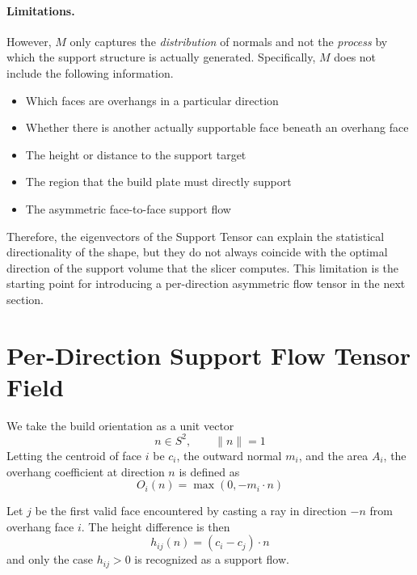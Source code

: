 \documentclass[11pt,a4paper]{article}
\begin{document}
\paragraph{Limitations.}
However, $M$ only captures the \emph{distribution} of normals and not the \emph{process} by which the support structure is actually generated.
Specifically, $M$ does not include the following information.

\begin{itemize}
\item Which faces are overhangs in a particular direction
\item Whether there is another actually supportable face beneath an overhang face
\item The height or distance to the support target
\item The region that the build plate must directly support
\item The asymmetric face-to-face support flow
\end{itemize}

Therefore, the eigenvectors of the Support Tensor can explain the statistical directionality of the shape,
but they do not always coincide with the optimal direction of the support volume that the slicer computes.
This limitation is the starting point for introducing a per-direction asymmetric flow tensor in the next section.

\section{Per-Direction Support Flow Tensor Field}
\label{sec:sftf}

We take the build orientation as a unit vector
\begin{equation}
n\in S^2, \qquad \|n\|=1
\end{equation}
Letting the centroid of face $i$ be $c_i$, the outward normal $m_i$, and the area $A_i$,
the overhang coefficient at direction $n$ is defined as
\begin{equation}
O_i(n)=\max(0,-m_i\cdot n)
\end{equation}

Let $j$ be the first valid face encountered by casting a ray in direction $-n$ from overhang face $i$.
The height difference is then
\begin{equation}
h_{ij}(n)=(c_i-c_j)\cdot n
\end{equation}
and only the case $h_{ij}>0$ is recognized as a support flow.
\end{document}
